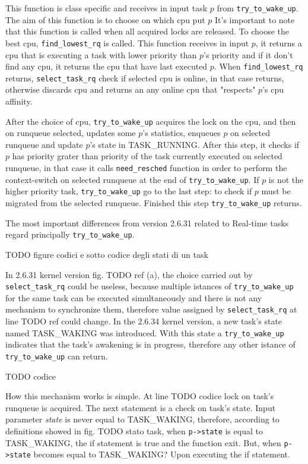 This function is class specific and receives in input task $p$ from \texttt{try\_to\_wake\_up}. The aim of this function is to choose on which cpu put $p$ 
It's important to note that this function is called when all acquired locks are released. To choose the best cpu, \texttt{find\_lowest\_rq} is called.
This function receives in input $p$, it returns a cpu that is executing a task with lower priority than $p$'s priority and if it don't find any cpu, it 
returns the cpu that have last executed $p$. When \texttt{find\_lowest\_rq} returns, \texttt{select\_task\_rq} check if selected cpu is online, in that case
returns, otherwise discards cpu and returns an any online cpu that "respects" $p$'s cpu affinity.

After the choice of cpu, \texttt{try\_to\_wake\_up} acquires the lock on the cpu, and then on runqueue selected, updates some $p$'s statistics, enqueues 
$p$ on selected runqueue and update $p$'s state in TASK\_RUNNING. After this step, it checks if $p$ has priority grater than priority of the task currently
executed on selected runqueue, in that case it calls \texttt{need\_resched} function in order to perform the context-switch on selected runqueue at the
end of \texttt{try\_to\_wake\_up}. If $p$ is not the higher priority task, \texttt{try\_to\_wake\_up} go to the last step: to check if $p$ must be migrated
from the selected runqueue. Finished this step \texttt{try\_to\_wake\_up} returns.

The most important differences from version 2.6.31 related to Real-time tasks regard principally \texttt{try\_to\_wake\_up}. 

TODO figure codici e sotto codice degli stati di un task

In 2.6.31 kernel version fig. TODO ref (a), the choice carried out by \texttt{select\_task\_rq} could be useless, because multiple istances of 
\texttt{try\_to\_wake\_up} for the same task can be executed simultaneously and there is not any mechanism to synchronize them, therefore value assigned 
by \texttt{select\_task\_rq} at line TODO ref could change. In the 2.6.34 kernel version, a new task's state named TASK\_WAKING was introduced. With this 
state a \texttt{try\_to\_wake\_up} indicates that the task's awakening is in progress, therefore any other istance of \texttt{try\_to\_wake\_up} can return.

TODO codice

How this mechanism works is simple. At line TODO codice lock on task's runqueue is acquired. The next statement is a check on task's state. Input parameter 
\textit{state} is never equal to TASK\_WAKING, therefore, according to definitions showed in fig. TODO stato task, when \texttt{p->state} is equal to 
TASK\_WAKING, the if statement is true and the function exit. But, when \texttt{p->state} becomes equal to TASK\_WAKING? Upon executing the if statement.

